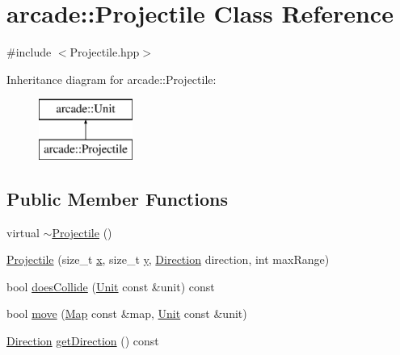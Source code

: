 \hypertarget{classarcade_1_1_projectile}{}\section{arcade\+:\+:Projectile Class Reference}
\label{classarcade_1_1_projectile}


{\ttfamily \#include $<$Projectile.\+hpp$>$}

Inheritance diagram for arcade\+:\+:Projectile\+:\begin{figure}[H]
\begin{center}
\leavevmode
\includegraphics[height=2.000000cm]{classarcade_1_1_projectile}
\end{center}
\end{figure}
\subsection*{Public Member Functions}
\begin{DoxyCompactItemize}
\item 
virtual \hyperlink{classarcade_1_1_projectile_a5307e3fe4f6fe16fc0b4cc03886e56dc}{$\sim$\+Projectile} ()
\item 
\hyperlink{classarcade_1_1_projectile_a9c807e2b75ce47ee02519ae69a7e10b5}{Projectile} (size\+\_\+t \hyperlink{include_2_protocol_8hpp_a4dde988b1b2adba65ae3efa69f65d960}{x}, size\+\_\+t \hyperlink{include_2_protocol_8hpp_ab0580f504a7428539be299fa71565f30}{y}, \hyperlink{classarcade_1_1_unit_af418afeaba1f7fd5934b6ae1343215dd}{Direction} direction, int max\+Range)
\item 
bool \hyperlink{classarcade_1_1_projectile_a109675966eb518e420351a2a6a4dce18}{does\+Collide} (\hyperlink{classarcade_1_1_unit}{Unit} const \&unit) const
\item 
bool \hyperlink{classarcade_1_1_projectile_a991b6754b6a12089b2b527d35f2d3ca9}{move} (\hyperlink{classarcade_1_1_map}{Map} const \&map, \hyperlink{classarcade_1_1_unit}{Unit} const \&unit)
\item 
\hyperlink{classarcade_1_1_unit_af418afeaba1f7fd5934b6ae1343215dd}{Direction} \hyperlink{classarcade_1_1_projectile_a29c62daa5cbdaa3e3dfdcf8265a86913}{get\+Direction} () const
\end{DoxyCompactItemize}
